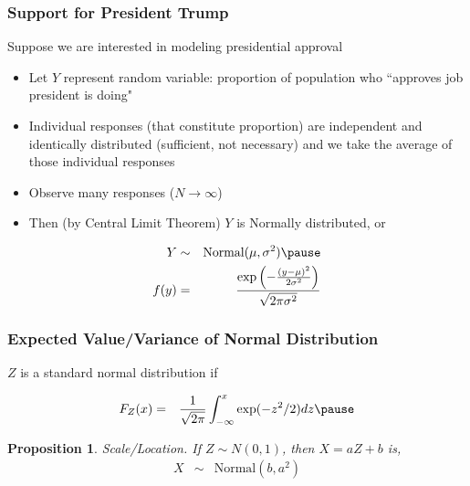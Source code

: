 \documentclass[handout]{beamer}
\newtheorem{prop}{Proposition}
\numberwithin{equation}{section}
\begin{document}
\begin{frame}
\frametitle{Support for President Trump} 

Suppose we are interested in modeling \alert{presidential approval} \pause 
\begin{itemize}
\item[-] Let $Y$ represent random variable: proportion of population who ``approves job president is doing" \pause 
\item[-] Individual responses (that constitute proportion) are \alert{independent} and \alert{identically} distributed (sufficient, not necessary) and we take the average of those individual responses \pause 
\item[-] Observe \alert{many} responses ($N\rightarrow \infty$) \pause 
\item[-] Then (by Central Limit Theorem) $Y$ is \alert{Normally} distributed, or  \pause 
\end{itemize}
\begin{eqnarray}
Y& \sim & \text{Normal}(\mu, \sigma^2) \nonumber  \pause \\
f(y) & = & \frac{\exp\left(-\frac{(y-\mu)^2}{2\sigma^2} \right)}{\sqrt{2\pi \sigma^2}} \nonumber 
\end{eqnarray}

\end{frame}



\begin{frame}
\frametitle{Expected Value/Variance of Normal Distribution}

$Z$ is a standard normal distribution if \pause 
{} \pause 



 \pause 
\begin{eqnarray}
F_{Z}(x) & = & \frac{1}{\sqrt{2\pi} }\int_{-\infty}^{x} \exp(-z^2/2) dz \nonumber  \pause 
\end{eqnarray}


\begin{prop} 
\alert{Scale/Location}.  If $Z \sim N(0,1)$, then $X = aZ + b$ is, 
\begin{eqnarray}
X & \sim & \text{Normal} (b, a^2) \nonumber 
\end{eqnarray}
\end{prop}



\end{frame}
\end{document}
